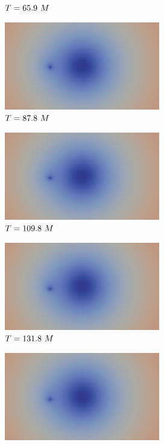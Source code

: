 \documentclass[landscape]{a0poster}
\begin{document}
\begin{textblock}{62}
\begin{textblock}{38}
\begin{figure}
\begin{subfigure}{0.0714\textwidth}
		\caption{\small ${T}=65.9~M$}
	\end{subfigure}
	\begin{subfigure}{0.0714\textwidth}
		\centering
		\includegraphics[height=1.5in]{figs/AE/r100/img_slice_000080.png}
		\caption{\small ${T}=87.8~M$}
	\end{subfigure}
	\begin{subfigure}{0.0714\textwidth}
		\centering
		\includegraphics[height=1.5in]{figs/AE/r100/img_slice_000100.png}
		\caption{\small ${T}=109.8~M$}
	\end{subfigure}
	\begin{subfigure}{0.0714\textwidth}
		\centering
		\includegraphics[height=1.5in]{figs/AE/r100/img_slice_000120.png}
		\caption{\small ${T}=131.8~M$}
	\end{subfigure}
	\begin{subfigure}{0.0714\textwidth}
		\centering
		\includegraphics[height=1.5in]{figs/AE/r100/img_slice_000140.png}

\end{subfigure}
\end{figure}
\end{textblock}
\end{textblock}
\end{document}
